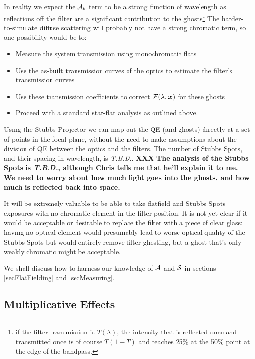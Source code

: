 \documentclass[12pt]{article}
\newcommand{\xb}{{\boldsymbol x}}
\newcommand{\Flat}{{\cal F}}
\newcommand{\additive}{{\cal A}}
\newcommand{\qe}{{\cal S}}
\newcommand{\TBD}{\textit{T.B.D.}\xspace}
\newcommand{\XXX}[1]{\textbf{XXX #1}\xspace}
\begin{document}
In reality we expect the $\additive_b$ term to be a strong function of wavelength as reflections off the filter
are a significant contribution to the ghosts\footnote{
  if the filter transmission is $T(\lambda)$, the intensity that is reflected once and transmitted once
  is of course $T(1-T)$ and reaches 25\% at the 50\% point at the edge of the bandpass.
  }
The harder-to-simulate diffuse scattering will probably not have a strong chromatic term, so one
possibility would be to:
\begin{itemize}
  \item Measure the system transmission using monochromatic flats
  \item Use the as-built transmission curves of the optics to estimate the filter's transmission curves
  \item Use these transmission coefficients to correct $\Flat(\lambda, \xb)$ for these ghosts
  \item Proceed with a standard star-flat analysis as outlined above.
\end{itemize}

Using the Stubbs Projector we can map out the QE (and ghosts) directly at a set of points in the focal plane,
without the need to make assumptions about the division of QE between the optics and the filters.  The number
of Stubbs Spots, and their spacing in wavelength, is \TBD.  \XXX{The analysis of the Stubbs Spots is \TBD,
  although Chris tells me that he'll explain it to me.  We need to worry about how much light goes into the
  ghosts, and how much is reflected back into space.}

It will be extremely valuable to be able to take flatfield and Stubbs Spots exposures with no chromatic element in the filter
position.  It is not yet clear if it would be acceptable or desirable to replace the filter with a piece of
clear glass: having no optical element would presumably lead to worse optical quality of the Stubbs Spots but
would entirely remove filter-ghosting, but a ghost that's only weakly chromatic might be acceptable.

We shall discuss how to harness our knowledge of $\additive$ and $\qe$ in sections \ref{secFlatFielding} and
\ref{secMeasuring}.

\subsection{Multiplicative Effects}
\end{document}
